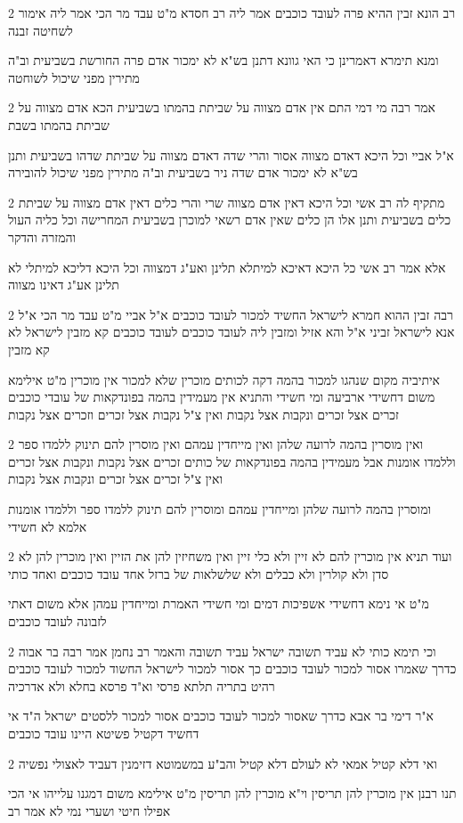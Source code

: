 \documentclass[12pt, openany]{book}
\newcommand{\sethebfont}{
\fontsize{10.5pt}{21.0pt} \selectfont
}
\newcommand{\twocol}[1]{
	{\sethebfont \begin{multicols}{2}
			#1
	\end{multicols}}	
}
\begin{document}
\twocol{רב הונא זבין ההיא פרה לעובד כוכבים אמר ליה רב חסדא מ"ט עבד מר הכי אמר ליה אימור לשחיטה זבנה
\par ומנא תימרא דאמרינן כי האי גוונא דתנן בש"א לא ימכור אדם פרה החורשת בשביעית וב"ה מתירין מפני שיכול לשוחטה}
\twocol{אמר רבה מי דמי התם אין אדם מצווה על שביתת בהמתו בשביעית הכא אדם מצווה על שביתת בהמתו בשבת
\par א"ל אביי וכל היכא דאדם מצווה אסור והרי שדה דאדם מצווה על שביתת שדהו בשביעית ותנן בש"א לא ימכור אדם שדה ניר בשביעית וב"ה מתירין מפני שיכול להובירה}
\twocol{מתקיף לה רב אשי וכל היכא דאין אדם מצווה שרי והרי כלים דאין אדם מצווה על שביתת כלים בשביעית ותנן אלו הן כלים שאין אדם רשאי למוכרן בשביעית המחרישה וכל כליה העול והמזרה והדקר
\par אלא אמר רב אשי כל היכא דאיכא למיתלא תלינן ואע"ג דמצווה וכל היכא דליכא למיתלי לא תלינן אע"ג דאינו מצווה}
\twocol{רבה זבין ההוא חמרא לישראל החשיד למכור לעובד כוכבים א"ל אביי מ"ט עבד מר הכי א"ל אנא לישראל זביני א"ל והא אזיל ומזבין ליה לעובד כוכבים לעובד כוכבים קא מזבין לישראל לא קא מזבין
\par איתיביה מקום שנהגו למכור בהמה דקה לכותים מוכרין שלא למכור אין מוכרין מ"ט אילימא משום דחשידי ארביעה ומי חשידי והתניא אין מעמידין בהמה בפונדקאות של עובדי כוכבים זכרים אצל זכרים ונקבות אצל נקבות ואין צ"ל נקבות אצל זכרים וזכרים אצל נקבות}
\twocol{ואין מוסרין בהמה לרועה שלהן ואין מייחדין עמהם ואין מוסרין להם תינוק ללמדו ספר וללמדו אומנות אבל מעמידין בהמה בפונדקאות של כותים זכרים אצל נקבות ונקבות אצל זכרים ואין צ"ל זכרים אצל זכרים ונקבות אצל נקבות
\par ומוסרין בהמה לרועה שלהן ומייחדין עמהם ומוסרין להם תינוק ללמדו ספר וללמדו אומנות אלמא לא חשידי}
\twocol{ועוד תניא אין מוכרין להם לא זיין ולא כלי זיין ואין משחיזין להן את הזיין ואין מוכרין להן לא סדן ולא קולרין ולא כבלים ולא שלשלאות של ברזל אחד עובד כוכבים ואחד כותי
\par מ"ט אי נימא דחשידי אשפיכות דמים ומי חשידי האמרת ומייחדין עמהן אלא משום דאתי לזבונה לעובד כוכבים}
\twocol{וכי תימא כותי לא עביד תשובה ישראל עביד תשובה והאמר רב נחמן אמר רבה בר אבוה כדרך שאמרו אסור למכור לעובד כוכבים כך אסור למכור לישראל החשוד למכור לעובד כוכבים רהיט בתריה תלתא פרסי וא"ד פרסא בחלא ולא אדרכיה
\par א"ר דימי בר אבא כדרך שאסור למכור לעובד כוכבים אסור למכור ללסטים ישראל ה"ד אי דחשיד דקטיל פשיטא היינו עובד כוכבים}
\twocol{ואי דלא קטיל אמאי לא לעולם דלא קטיל והב"ע במשמוטא דזימנין דעביד לאצולי נפשיה
\par תנו רבנן אין מוכרין להן תריסין וי"א מוכרין להן תריסין מ"ט אילימא משום דמגנו עלייהו אי הכי אפילו חיטי ושערי נמי לא אמר רב}
\end{document}
